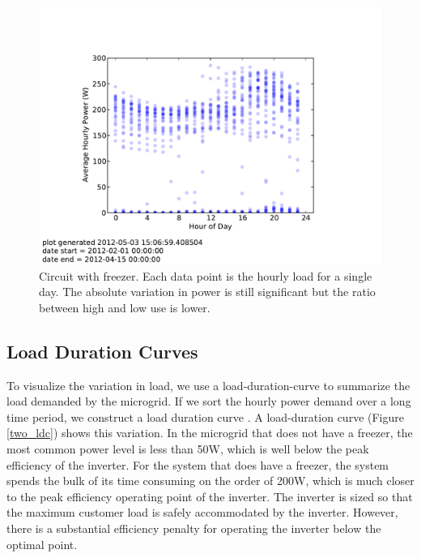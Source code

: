 \documentclass[conference]{IEEEtran}
\begin{document}
\begin{figure}[]
\begin{center}
\includegraphics[trim = 0.7in 0.8in 0.7in 1.1in, clip, width=\columnwidth]
{figures/freezer_profile.pdf}
\end{center}
\caption{Circuit with freezer.
Each data point is the hourly load for a single day.
The absolute variation in power is still significant but the
ratio between high and low use is lower.}
\label{freezer}
\end{figure}

\subsection{Load Duration Curves}

To visualize the variation in load, we use a load-duration-curve
to summarize the load demanded by the microgrid.
If we sort the hourly power demand over a long time period, we
construct a load duration curve \cite{REEPS}.
A load-duration curve (Figure \ref{two_ldc}) shows this variation.
In the microgrid that does not have a freezer, the most common
power level is less than 50W, which is well below the peak
efficiency of the inverter.
For the system that does have a freezer, the system spends the bulk
of its time consuming on the order of 200W, which is much closer
to the peak efficiency operating point of the inverter.
The inverter is sized so that the maximum customer load is safely
accommodated by the inverter.
However, there is a substantial efficiency penalty for operating the
inverter below the optimal point.
\end{document}
